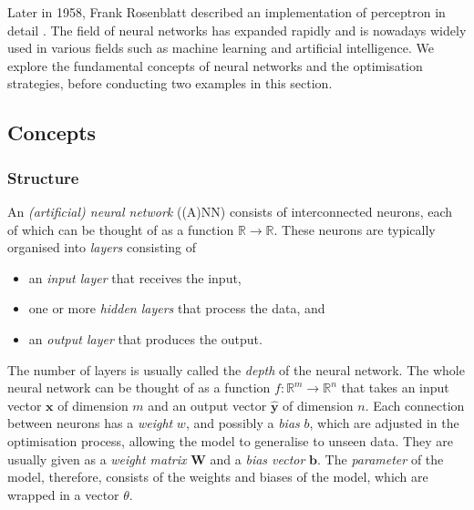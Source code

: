 \documentclass[a4paper,11pt,titlepage]{article}
\theoremstyle{definition}
\theoremstyle{plain}
\theoremstyle{remark}
\begin{document}
Later in 1958, Frank Rosenblatt described an implementation of perceptron in detail \cite{Rosenblatt1958}. The field of neural networks has expanded rapidly and is nowadays widely used in various fields such as machine learning and artificial intelligence. We explore the fundamental concepts of neural networks and the optimisation strategies, before conducting two examples in this section.

\subsection{Concepts}

\subsubsection{Structure}

An \textit{(artificial) neural network} ((A)NN) consists of interconnected neurons, each of which can be thought of as a function $\mathbb{R}\rightarrow\mathbb{R}$. These neurons are typically organised into \textit{layers} consisting of

\begin{itemize}
    \item an \textit{input layer} that receives the input,
    \item one or more \textit{hidden layers} that process the data, and
    \item an \textit{output layer} that produces the output.
\end{itemize}

The number of layers is usually called the \textit{depth} of the neural network. The whole neural network can be thought of as a function $f: \mathbb{R}^m\rightarrow\mathbb{R}^n$ that takes an input vector $\mathbf{x}$ of dimension $m$ and an output vector $\mathbf{\hat{y}}$ of dimension $n$. Each connection between neurons has a \textit{weight} $w$, and possibly a \textit{bias} $b$, which are adjusted in the optimisation process, allowing the model to generalise to unseen data. They are usually given as a \textit{weight matrix} $\mathbf{W}$ and a \textit{bias vector} $\mathbf{b}$. The \textit{parameter} of the model, therefore, consists of the weights and biases of the model, which are wrapped in a vector $\theta$.
\end{document}

